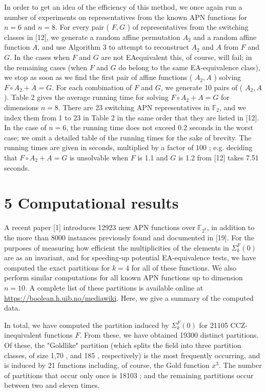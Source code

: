 \documentclass[10pt]{article}
\begin{document}
In order to get an idea of the efficiency of this method, we once again run a number of experiments on representatives from the known APN functions for $n=6$ and $n=8$. For every pair ( $F, G$ ) of representatives from the switching classes in [12], we generate a random affine permutation $A_{2}$ and a random affine function $A$, and use Algorithm 3 to attempt to reconstruct $A_{2}$ and $A$ from $F$ and $G$. In the cases when $F$ and $G$ are not EAequivalent this, of course, will fail; in the remaining cases (when $F$ and $G$ do belong to the same EA-equivalence class), we stop as soon as we find the first pair of affine functions ( $A_{2}, A$ ) solving $F \circ A_{2}+A=G$. For each combination of $F$ and $G$, we generate 10 pairs of ( $A_{2}, A$ ). Table 2 gives the average running time for solving $F \circ A_{2}+A=G$ for dimensions $n=8$. There are 23 switching APN representatives in $\mathbb{F}_{2}$, and we index them from 1 to 23 in Table 2 in the same order that they are listed in [12]. In the case of $n=6$, the running time does not exceed 0.2 seconds in the worst case; we omit a detailed table of the running times for the sake of brevity. The running times are given in seconds, multiplied by a factor of 100 ; e.g. deciding that $F \circ A_{2}+A=G$ is unsolvable when $F$ is 1.1 and $G$ is 1.2 from [12] takes 7.51 seconds.

\section*{5 Computational results}
A recent paper [1] introduces 12923 new APN functions over $\mathbb{F}_{2^{8}}$, in addition to the more than 8000 instances previously found and documented in [19]. For the purposes of measuring how efficient the multiplicities of the elements in $\Sigma_{k}^{F}(0)$ are as an invariant, and for speeding-up potential EA-equivalence tests, we have computed the exact partitions for $k=4$ for all of these functions. We also perform similar computations for all known APN functions up to dimension $n=10$. A complete list of these partitions is available online at \href{https://boolean.h.uib.no/mediawiki}{https://boolean.h.uib.no/mediawiki}. Here, we give a summary of the computed data.

In total, we have computed the partition induced by $\Sigma_{k}^{F}(0)$ for 21105 CCZ-inequivalent functions $F$. From these, we have obtained 19300 distinct partitions. Of these, the "Goldlike" partition (which splits the field into three partition classes, of size 1,70 , and 185 , respectively) is the most frequently occurring, and is induced by 21 functions including, of course, the Gold function $x^{3}$. The number of partitions that occur only once is 18103 ; and the remaining partitions occur between two and eleven times.
\end{document}
